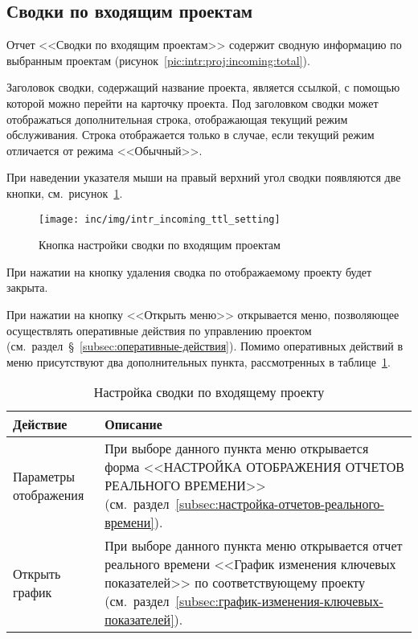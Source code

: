 \subsection{Сводки по входящим проектам}

Отчет <<Сводки по входящим проектам>> содержит сводную информацию по выбранным проектам (рисунок~\ref{pic:intr:proj:incoming:total}).

Заголовок сводки, содержащий название проекта, является ссылкой, с помощью которой можно перейти на карточку проекта.
Под заголовком сводки может отображаться дополнительная строка, отображающая текущий режим обслуживания.
Строка отображается только в случае, если текущий режим отличается от режима <<Обычный>>.

При наведении указателя мыши на правый верхний угол сводки появляются две кнопки, см.~рисунок~\ref{pic:intr:proj:incoming:total:setting}.

\begin{figure}[ht]
    \centering
    \texttt{[image: inc/img/intr\_incoming\_ttl\_setting]}
    \caption{Кнопка настройки сводки по входящим проектам}
    \label{pic:intr:proj:incoming:total:setting}
\end{figure}

При нажатии на кнопку удаления сводка по отображаемому проекту будет закрыта.

При нажатии на кнопку <<Открыть меню>> открывается меню, позволяющее осуществлять оперативные действия по управлению проектом (см.~раздел~\S~\ref{subsec:оперативные-действия}).
Помимо оперативных действий в меню присутствуют два дополнительных пункта, рассмотренных в таблице~\ref{tab:prj:incoming:ttl:setting}.

\begin{table}[ht]
    \caption{Настройка сводки по входящему проекту}
    \begin{small}
        \begin{tabular}{|p{}|p{}|}
            \hline
            Действие & Описание \\
            \hline
            Параметры отображения & При выборе данного пункта меню открывается форма <<НАСТРОЙКА ОТОБРАЖЕНИЯ ОТЧЕТОВ РЕАЛЬНОГО ВРЕМЕНИ>> (см.~раздел~\ref{subsec:настройка-отчетов-реального-времени}).\\
            \hline
            Открыть график & При выборе данного пункта меню открывается отчет реального времени <<График изменения ключевых показателей>> по соответствующему проекту (см.~раздел~\ref{subsec:график-изменения-ключевых-показателей}).\\
            \hline
        \end{tabular}
    \end{small}
    \label{tab:prj:incoming:ttl:setting}
\end{table}

